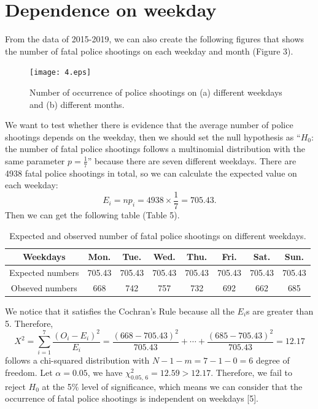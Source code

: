 \documentclass[a4paper]{article}
\begin{document}
\section{Dependence on weekday}
	From the data of 2015-2019, we can also create the following figures that shows the number of fatal police shootings on each weekday and month (Figure 3).
\begin{figure}[H]
\centering
\texttt{[image: 4.eps]}
\captionsetup{justification=centering}
\caption{Number of occurrence of police shootings on (a) different weekdays and (b) different months.}
\end{figure}

We want to test whether there is evidence that the average number of police shootings depends on the weekday, then we should set the null hypothesis as “$H_0$: the number of fatal police shootings follows a multinomial distribution with the same parameter $p=\frac{1}{7}$” because there are seven different weekdays. There are 4938 fatal police shootings in total, so we can calculate the expected value on each weekday:
$$E_i=np_i=4938\times\frac{1}{7}=705.43.$$
Then we can get the following table (Table 5).
\begin{table}[H]
\centering
\begin{tabular}{|c|c|c|c|c|c|c|c|}
\hline
Weekdays         & Mon.   & Tue.   & Wed.   & Thu.  & Fri.   & Sat.   & Sun.   \\ \hline
Expected numbers & 705.43 & 705.43 & 705.43 & 705.43 & 705.43 & 705.43 & 705.43 \\ \hline
Obseved numbers  & 668    & 742    & 757    & 732    & 692    & 662    & 685    \\ \hline
\end{tabular}
\caption{Expected and observed number of fatal police shootings on different weekdays.}
\end{table}

We notice that it satisfies the Cochran's Rule because all the $E_i$s are greater than 5. Therefore,
$$X^2=\sum_{i=1}^7\frac{(O_i-E_i)^2}{E_i}=\frac{(668-705.43)^2}{705.43}+\cdots+\frac{(685-705.43)^2}{705.43}=12.17$$ follows a chi-squared distribution with $N-1-m=7-1-0=6$ degree of freedom. Let $\alpha=0.05$, we have $\chi_{0.05,\,6}^2=12.59>12.17$. Therefore, we fail to reject $H_0$ at the 5\% level of significance, which means we can consider that the occurrence of fatal police shootings is independent on weekdays [5].
\end{document}
